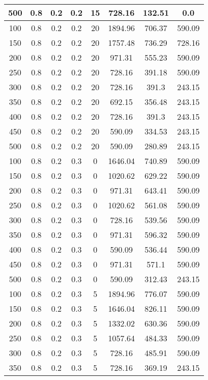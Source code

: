 \documentclass[a4paper, 12pt]{extreport}
\begin{document}
\begin{itemize}
\begin{longtable}{|c|c|c|c|c|c|c|c|}
			500 & 0.8 & 0.2 & 0.2 & 15 & 728.16 & 132.51 & 0.0 \\\hline
			100 & 0.8 & 0.2 & 0.2 & 20 & 1894.96 & 706.37 & 590.09 \\\hline
			150 & 0.8 & 0.2 & 0.2 & 20 & 1757.48 & 736.29 & 728.16 \\\hline
			200 & 0.8 & 0.2 & 0.2 & 20 & 971.31 & 555.23 & 590.09 \\\hline
			250 & 0.8 & 0.2 & 0.2 & 20 & 728.16 & 391.18 & 590.09 \\\hline
			300 & 0.8 & 0.2 & 0.2 & 20 & 728.16 & 391.3 & 243.15 \\\hline
			350 & 0.8 & 0.2 & 0.2 & 20 & 692.15 & 356.48 & 243.15 \\\hline
			400 & 0.8 & 0.2 & 0.2 & 20 & 728.16 & 391.3 & 243.15 \\\hline
			450 & 0.8 & 0.2 & 0.2 & 20 & 590.09 & 334.53 & 243.15 \\\hline
			500 & 0.8 & 0.2 & 0.2 & 20 & 590.09 & 280.89 & 243.15 \\\hline
			100 & 0.8 & 0.2 & 0.3 & 0 & 1646.04 & 740.89 & 590.09 \\\hline
			150 & 0.8 & 0.2 & 0.3 & 0 & 1020.62 & 629.22 & 590.09 \\\hline
			200 & 0.8 & 0.2 & 0.3 & 0 & 971.31 & 643.41 & 590.09 \\\hline
			250 & 0.8 & 0.2 & 0.3 & 0 & 1020.62 & 561.08 & 590.09 \\\hline
			300 & 0.8 & 0.2 & 0.3 & 0 & 728.16 & 539.56 & 590.09 \\\hline
			350 & 0.8 & 0.2 & 0.3 & 0 & 971.31 & 596.32 & 590.09 \\\hline
			400 & 0.8 & 0.2 & 0.3 & 0 & 590.09 & 536.44 & 590.09 \\\hline
			450 & 0.8 & 0.2 & 0.3 & 0 & 971.31 & 571.1 & 590.09 \\\hline
			500 & 0.8 & 0.2 & 0.3 & 0 & 590.09 & 312.43 & 243.15 \\\hline
			100 & 0.8 & 0.2 & 0.3 & 5 & 1894.96 & 776.07 & 590.09 \\\hline
			150 & 0.8 & 0.2 & 0.3 & 5 & 1646.04 & 826.11 & 590.09 \\\hline
			200 & 0.8 & 0.2 & 0.3 & 5 & 1332.02 & 630.36 & 590.09 \\\hline
			250 & 0.8 & 0.2 & 0.3 & 5 & 1057.64 & 484.33 & 590.09 \\\hline
			300 & 0.8 & 0.2 & 0.3 & 5 & 728.16 & 485.91 & 590.09 \\\hline
			350 & 0.8 & 0.2 & 0.3 & 5 & 728.16 & 369.19 & 243.15 \\\hline

\end{longtable}
\end{itemize}
\end{document}
